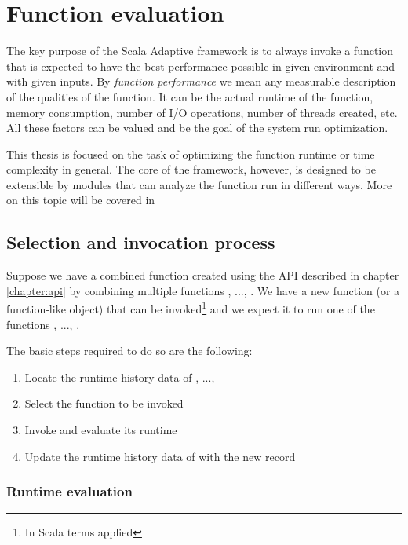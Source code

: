 \chapter{Function evaluation}

The key purpose of the Scala Adaptive framework is to always invoke a function that is expected to have the best performance possible in given environment and with given inputs. By \textit{function performance} we mean any measurable description of the qualities of the function. It can be the actual runtime of the function, memory consumption, number of I/O operations, number of threads created, etc. All these factors can be valued and be the goal of the system run optimization.

This thesis is focused on the task of optimizing the function runtime or time complexity in general. The core of the framework, however, is designed to be extensible by modules that can analyze the function run in different ways. More on this topic will be covered in %

\section{Selection and invocation process}

Suppose we have a combined function  created using the API described in chapter \ref{chapter:api} by combining multiple functions , ..., . We have a new function (or a function-like object) that can be invoked\footnote{In Scala terms applied} and we expect it to run one of the functions , ..., .

The basic steps required to do so are the following:

\begin{enumerate}
	\item Locate the runtime history data of , ..., 
	\item Select the function  to be invoked
	\item Invoke  and evaluate its runtime
	\item Update the runtime history data of  with the new record
\end{enumerate}

\subsection{Runtime evaluation}

